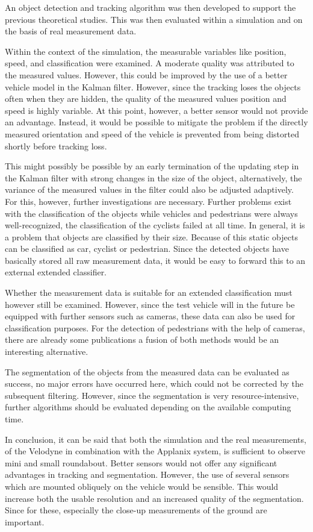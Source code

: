 \documentclass[11pt,oneside,openright]{mpreport}
\begin{document}
An object detection and tracking algorithm was then developed to support the previous theoretical studies.
This was then evaluated within a simulation and on the basis of real measurement data.

Within the context of the simulation, the measurable variables like position, speed, and classification were examined.
A moderate quality was attributed to the measured values.
However, this could be improved by the use of a better vehicle model in the Kalman filter.
However, since the tracking loses the objects often when they are hidden, the quality of the measured
values position and speed is highly variable. At this point, however, a better sensor would not provide an advantage.
Instead, it would be possible to mitigate the problem if the directly measured orientation and speed of the vehicle
is prevented from being distorted shortly before tracking loss.

This might possibly be possible by an early termination of the updating step in the Kalman filter
with strong changes in the size of the object, alternatively, the variance of the measured values in the
filter could also be adjusted adaptively. For this, however, further investigations are necessary.
Further problems exist with the classification of the objects while vehicles and pedestrians were always well-recognized,
the classification of the cyclists failed at all time. In general, it is a problem that objects are classified by their size.
Because of this static objects can be classified as car, cyclist or pedestrian.
Since the detected objects have basically stored all raw measurement data, it would be easy to forward this
to an external extended classifier. 

Whether the measurement data is suitable for an extended classification must however still be examined.
However, since the test vehicle will in the future be equipped with further sensors such as cameras, 
these data can also be used for classification purposes. 
For the detection of pedestrians with the help of cameras, there are already some publications \cite{Lee2015, Tuong2011} 
a fusion of both methods would be an interesting alternative.


The segmentation of the objects from the measured data can be evaluated as success, 
no major errors have occurred here, which could not be corrected by the subsequent filtering.
However, since the segmentation is very resource-intensive, further algorithms should be evaluated depending on 
the available computing time.


In conclusion, it can be said that both the simulation and the real measurements,
of the Velodyne in combination with the Applanix system,
is sufficient to observe mini and small roundabout.
Better sensors would not offer any significant advantages in tracking and segmentation.
However, the use of several sensors which are mounted obliquely on the vehicle would be sensible.
This would increase both the usable resolution and an increased quality of the segmentation.
Since for these, especially the close-up measurements of the ground are important.






\printbibliography
\end{document}
